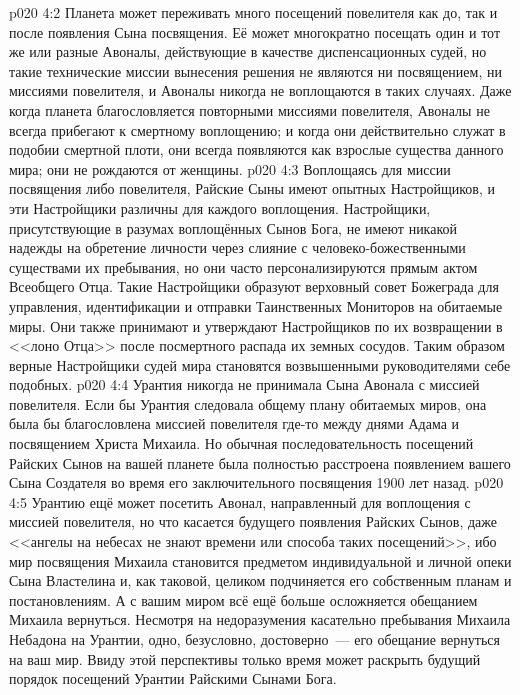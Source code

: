 \vs p020 4:2 Планета может переживать много посещений повелителя как до, так и после появления Сына посвящения. Её может многократно посещать один и тот же или разные Авоналы, действующие в качестве диспенсационных судей, но такие технические миссии вынесения решения не являются ни посвящением, ни миссиями повелителя, и Авоналы никогда не воплощаются в таких случаях. Даже когда планета благословляется повторными миссиями повелителя, Авоналы не всегда прибегают к смертному воплощению; и когда они действительно служат в подобии смертной плоти, они всегда появляются как взрослые существа данного мира; они не рождаются от женщины.
\vs p020 4:3 Воплощаясь для миссии посвящения либо повелителя, Райские Сыны имеют опытных Настройщиков, и эти Настройщики различны для каждого воплощения. Настройщики, присутствующие в разумах воплощённых Сынов Бога, не имеют никакой надежды на обретение личности через слияние с человеко\hyp{}божественными существами их пребывания, но они часто персонализируются прямым актом Всеобщего Отца. Такие Настройщики образуют верховный совет Божеграда для управления, идентификации и отправки Таинственных Мониторов на обитаемые миры. Они также принимают и утверждают Настройщиков по их возвращении в <<лоно Отца>> после посмертного распада их земных сосудов. Таким образом верные Настройщики судей мира становятся возвышенными руководителями себе подобных.
\vs p020 4:4 \pc Урантия никогда не принимала Сына Авонала с миссией повелителя. Если бы Урантия следовала общему плану обитаемых миров, она была бы благословлена миссией повелителя где\hyp{}то между днями Адама и посвящением Христа Михаила. Но обычная последовательность посещений Райских Сынов на вашей планете была полностью расстроена появлением вашего Сына Создателя во время его заключительного посвящения 1900 лет назад.
\vs p020 4:5 Урантию ещё может посетить Авонал, направленный для воплощения с миссией повелителя, но что касается будущего появления Райских Сынов, даже <<ангелы на небесах не знают времени или способа таких посещений>>, ибо мир посвящения Михаила становится предметом индивидуальной и личной опеки Сына Властелина и, как таковой, целиком подчиняется его собственным планам и постановлениям. А с вашим миром всё ещё больше осложняется обещанием Михаила вернуться. Несмотря на недоразумения касательно пребывания Михаила Небадона на Урантии, одно, безусловно, достоверно~--- его обещание вернуться на ваш мир. Ввиду этой перспективы только время может раскрыть будущий порядок посещений Урантии Райскими Сынами Бога.
